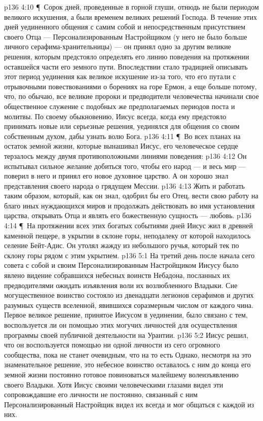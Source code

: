 \vs p136 4:10 \P\ Сорок дней, проведенные в горной глуши, отнюдь не были периодом великого искушения, а были временем великих решений Господа. В течение этих дней уединенного общения с самим собой и непосредственным присутствием своего Отца --- Персонализированным Настройщиком (у него не было больше личного серафима\hyp{}хранительницы) --- он принял одно за другим великие решения, которым предстояло определять его линию поведения на протяжении оставшейся части его земного пути. Впоследствии стало традицией описывать этот период уединения как великое искушение из\hyp{}за того, что его путали с отрывочными повествованиями о борениях на горе Ермон, а еще больше потому, что, по обычаю, все великие пророки и предводители человечества начинали свое общественное служение с подобных же предполагаемых периодов поста и молитвы. По своему обыкновению, Иисус всегда, когда ему предстояло принимать новые или серьезные решения, уединялся для общения со своим собственным духом, дабы узнать волю Бога.
\vs p136 4:11 \P\ Во всех планах на остаток земной жизни, которые вынашивал Иисус, его человеческое сердце терзалось между двумя противоположными линиями поведения:
\vs p136 4:12 \bibnobreakspace Он испытывал сильное желание добиться того, чтобы его народ --- и весь мир --- поверил в него и принял его новое духовное царство. А он хорошо знал представления своего народа о грядущем Мессии.
\vs p136 4:13 \bibnobreakspace Жить и работать таким образом, который, как он знал, одобрил бы его Отец, вести свою работу на благо иных нуждающихся миров и продолжать действовать во имя установления царства, открывать Отца и являть его божественную сущность --- любовь.
\vs p136 4:14 \P\ На протяжении всех этих богатых событиями дней Иисус жил в древней каменной пещере, в укрытии в склоне горы, неподалеку от которой находилось селение Бейт\hyp{}Адис. Он утолял жажду из небольшого ручья, который тек по склону горы рядом с этим укрытием.
\vs p136 5:1 На третий день после начала сего совета с собой и своим Персонализированным Настройщиком Иисусу было явлено видение собравшихся небесных воинств Небадона, посланных их предводителями ожидать изъявления воли их возлюбленного Владыки. Сие могущественное воинство состояло из двенадцати легионов серафимов и других разумных существ вселенной, явившихся соразмерным числом от каждого чина. Первое великое решение, принятое Иисусом в уединении, было связано с тем, воспользуется ли он помощью этих могучих личностей для осуществления программы своей публичной деятельности на Урантии.
\vs p136 5:2 Иисус решил, что он  воспользуется помощью ни одной личности из сего огромного сообщества, пока не станет очевидным, что на то есть  Однако, несмотря на это знаменательное решение, это небесное воинство оставалось с ним до конца его земной жизни постоянно готовое повиноваться малейшему волеизъявлению своего Владыки. Хотя Иисус своими человеческими глазами видел эти сопровождавшие его личности не постоянно, связанный с ним Персонализированный Настройщик видел их всегда и мог общаться с каждой из них.
